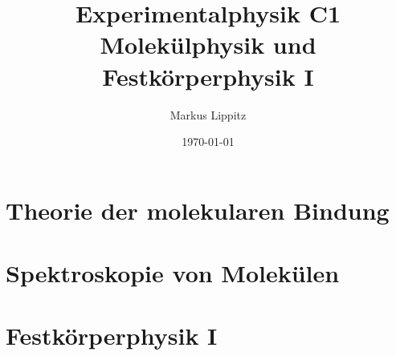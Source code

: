 \documentclass[notoc,nofonts,a4paper,twoside,nobib]{tufte-book}
\newcommand{\kapitelname}{Kapitel\ }
\begin{document}
  \tikzexternaldisable


\title{Experimentalphysik C1 \\ Molekülphysik und Festkörperphysik I}

\author{Markus Lippitz}
\date{\today}


\maketitle


%
\tableofcontents




\part{Theorie der molekularen Bindung}







\part{Spektroskopie von Molekülen}







\part{Festkörperphysik I}
%







%
%
%
%
%
%


\renewcommand{\kapitelname}{Anhang\ }


\appendix
\appendixpage




%

\printbibliography
\end{document}
